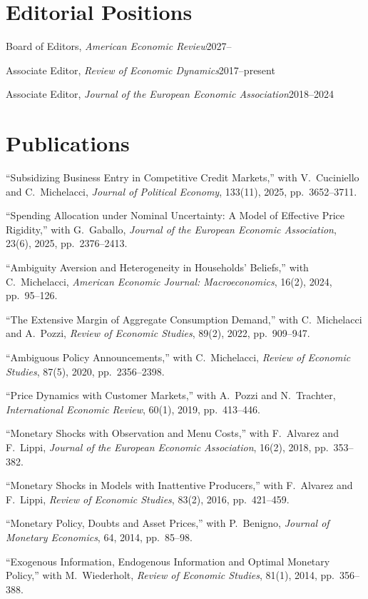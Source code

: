 \documentclass[11pt]{article}
\newcommand{\entry}[2]{\noindent #1\hfill #2\par}
\newenvironment{pubs}{\begin{list}{}{\setlength{\leftmargin}{1.5em}\setlength{\itemindent}{-1.5em}\setlength{\itemsep}{0.35em}\setlength{\parsep}{0pt}\setlength{\topsep}{0.2em}}}{\end{list}}
\begin{document}
\section{Editorial Positions}
\entry{Board of Editors, \emph{American Economic Review}}{2027--}
\entry{Associate Editor, \emph{Review of Economic Dynamics}}{2017--present}
\entry{Associate Editor, \emph{Journal of the European Economic Association}}{2018--2024}

\section{Publications}
\begin{pubs}
\item ``Subsidizing Business Entry in Competitive Credit Markets,'' with V.~Cuciniello and C.~Michelacci, \emph{Journal of Political Economy}, 133(11), 2025, pp.~3652--3711.
\item ``Spending Allocation under Nominal Uncertainty: A Model of Effective Price Rigidity,'' with G.~Gaballo, \emph{Journal of the European Economic Association}, 23(6), 2025, pp.~2376--2413.
\item ``Ambiguity Aversion and Heterogeneity in Households' Beliefs,'' with C.~Michelacci, \emph{American Economic Journal: Macroeconomics}, 16(2), 2024, pp.~95--126.
\item ``The Extensive Margin of Aggregate Consumption Demand,'' with C.~Michelacci and A.~Pozzi, \emph{Review of Economic Studies}, 89(2), 2022, pp.~909--947.
\item ``Ambiguous Policy Announcements,'' with C.~Michelacci, \emph{Review of Economic Studies}, 87(5), 2020, pp.~2356--2398.
\item ``Price Dynamics with Customer Markets,'' with A.~Pozzi and N.~Trachter, \emph{International Economic Review}, 60(1), 2019, pp.~413--446.
\item ``Monetary Shocks with Observation and Menu Costs,'' with F.~Alvarez and F.~Lippi, \emph{Journal of the European Economic Association}, 16(2), 2018, pp.~353--382.
\item ``Monetary Shocks in Models with Inattentive Producers,'' with F.~Alvarez and F.~Lippi, \emph{Review of Economic Studies}, 83(2), 2016, pp.~421--459.
\item ``Monetary Policy, Doubts and Asset Prices,'' with P.~Benigno, \emph{Journal of Monetary Economics}, 64, 2014, pp.~85--98.
\item ``Exogenous Information, Endogenous Information and Optimal Monetary Policy,'' with M.~Wiederholt, \emph{Review of Economic Studies}, 81(1), 2014, pp.~356--388.

\end{pubs}
\end{document}
